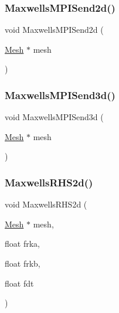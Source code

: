 \mbox{\label{a00554_afec0a6701e6aba907861d94fd2ac8276}} 
\subsubsection{\texorpdfstring{Maxwells\+M\+P\+I\+Send2d()}{MaxwellsMPISend2d()}}
{\footnotesize\ttfamily void Maxwells\+M\+P\+I\+Send2d (\begin{DoxyParamCaption}\item[{\hyperlink{a00557_aeffbe0891ab73a4d8964c9cb7978426e}{Mesh} $\ast$}]{mesh }\end{DoxyParamCaption})}

\mbox{\label{a00554_a9483c9abdd975a939e1c1e127d64441e}} 
\subsubsection{\texorpdfstring{Maxwells\+M\+P\+I\+Send3d()}{MaxwellsMPISend3d()}}
{\footnotesize\ttfamily void Maxwells\+M\+P\+I\+Send3d (\begin{DoxyParamCaption}\item[{\hyperlink{a00557_aeffbe0891ab73a4d8964c9cb7978426e}{Mesh} $\ast$}]{mesh }\end{DoxyParamCaption})}

\mbox{\label{a00554_acabe0a53c2062136f9d423f071668a02}} 
\subsubsection{\texorpdfstring{Maxwells\+R\+H\+S2d()}{MaxwellsRHS2d()}}
{\footnotesize\ttfamily void Maxwells\+R\+H\+S2d (\begin{DoxyParamCaption}\item[{\hyperlink{a00557_aeffbe0891ab73a4d8964c9cb7978426e}{Mesh} $\ast$}]{mesh,  }\item[{float}]{frka,  }\item[{float}]{frkb,  }\item[{float}]{fdt }\end{DoxyParamCaption})}

